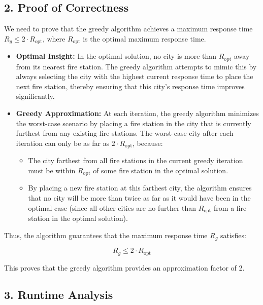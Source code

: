 \documentclass[11pt]{article}
\begin{document}
\subsection*{2. Proof of Correctness}

We need to prove that the greedy algorithm achieves a maximum response time \( R_g \leq 2 \cdot R_{\text{opt}} \), where \( R_{\text{opt}} \) is the optimal maximum response time.

\begin{itemize}
    \item \textbf{Optimal Insight:}
    In the optimal solution, no city is more than \( R_{\text{opt}} \) away from its nearest fire station. The greedy algorithm attempts to mimic this by always selecting the city with the highest current response time to place the next fire station, thereby ensuring that this city’s response time improves significantly.

    \item \textbf{Greedy Approximation:}
    At each iteration, the greedy algorithm minimizes the worst-case scenario by placing a fire station in the city that is currently furthest from any existing fire stations. The worst-case city after each iteration can only be as far as \( 2 \cdot R_{\text{opt}} \), because:
    \begin{itemize}
        \item The city farthest from all fire stations in the current greedy iteration must be within \( R_{\text{opt}} \) of some fire station in the optimal solution.
        \item By placing a new fire station at this farthest city, the algorithm ensures that no city will be more than twice as far as it would have been in the optimal case (since all other cities are no further than \( R_{\text{opt}} \) from a fire station in the optimal solution).
    \end{itemize}
\end{itemize}

Thus, the algorithm guarantees that the maximum response time \( R_g \) satisfies:

\[
R_g \leq 2 \cdot R_{\text{opt}}
\]

This proves that the greedy algorithm provides an approximation factor of 2.

\subsection*{3. Runtime Analysis}
\end{document}
